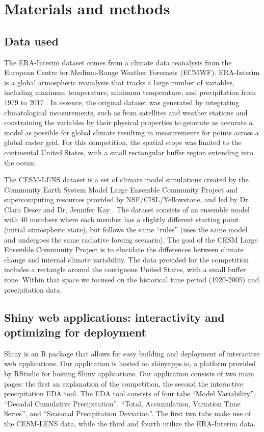 \documentclass[10pt,letterpaper]{article}
\begin{document}
\section*{Materials and methods}

\subsection*{Data used}

The ERA-Interim dataset comes from a climate data reanalysis from the European Centre for Medium-Range Weather Forecasts (ECMWF). ERA-Interim is a global atmospheric reanalysis that tracks a large number of variables, including maximum temperature, minimum temperature, and precipitation from 1979 to 2017 \cite{era}. In essence, the original dataset was generated by integrating climatological measurements, such as from satellites and weather stations and constraining the variables by their physical properties to generate as accurate a model as possible for global climate resulting in measurements for points across a global raster grid. For this competition, the spatial scope was limited to the continental United States, with a small rectangular buffer region extending into the ocean.

The CESM-LENS dataset is a set of climate model simulations created by the Community Earth System Model Large Ensemble Community Project and supercomputing resources provided by NSF/CISL/Yellowstone, and led by Dr. Clara Deser and Dr. Jennifer Kay \cite{CESM}. The dataset consists of an ensemble model with 40 members where each member has a slightly different starting point (initial atmospheric state), but follows the same “rules” (uses the same model and undergoes the same radiative forcing scenario)\cite{kotu_deshpande_2019}. The goal of the CESM Large Ensemble Community Project is to elucidate the differences between climate change and internal climate variability.  The data provided for the competition includes a rectangle around the contiguous United States, with a small buffer zone. Within that space we focused on the historical time period (1920-2005) and precipitation data.


\subsection*{Shiny web applications: interactivity and optimizing for deployment}


Shiny\cite{shiny} is an R\cite{R} package that allows for easy building and deployment of interactive web applications. Our application is hosted on shinyapps.io, a platform provided by RStudio for hosting Shiny applications. Our application consists of two main pages: the first an explanation of the competition, the second the interactive precipitation EDA tool. The EDA tool consists of four tabs “Model Variability”, “Decadal Cumulative Precipitation”, “Total, Accumulation, Variation Time Series”, and “Seasonal Precipitation Deviation”. The first two tabs make use of the CESM-LENS data, while the third and fourth utilize the ERA-Interim data.
\end{document}
